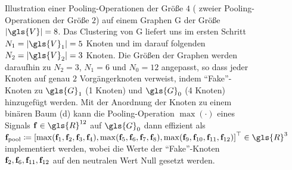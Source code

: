 \begin{figure}[t]
{
}
\caption[Pooling auf Graphen]{Illustration einer Pooling-Operationen der Größe $4$ (\bzw{} zweier Pooling-Operationen der Größe $2$) auf einem Graphen \gls{G} der Größe $\left|\gls{V}\right| = 8$.
Das Clustering von \gls{G} liefert uns im ersten Schritt $N_1 =\left|\gls{V}_1\right| = 5$ Knoten und im darauf folgenden $N_2 = \left|\gls{V}_2\right| = 3$ Knoten.
Die Größen der Graphen werden daraufhin zu $N_2 = 3$, $N_1 = 6$ und $N_0 = 12$ angepasst, so dass jeder Knoten auf genau $2$ Vorgängerknoten verweist, indem \enquote{Fake}-Knoten zu $\gls{G}_1$ (1 Knoten) und $\gls{G}_0$ (4 Knoten) hinzugefügt werden.
Mit der Anordnung der Knoten zu einem binären Baum (d) kann die Pooling-Operation $\max\left(\cdot\right)$ eines Signals $\ve{f} \in \gls{R}^{12}$ auf $\gls{G}_0$ dann effizient als $\ve{f}_{\mathrm{pool}} \coloneqq {\left[ \max\left(\ve{f}_1, \ve{f}_2, \ve{f}_3, \ve{f}_4 \right), \max\left(\ve{f}_5, \ve{f}_6, \ve{f}_7, \ve{f}_8 \right), \max\left(\ve{f}_9, \ve{f}_{10}, \ve{f}_{11}, \ve{f}_{12} \right) \right]}^{\top} \in \gls{R}^3$ implementiert werden, wobei die Werte der \enquote{Fake}-Knoten $\mathbf{f}_2, \mathbf{f}_6, \mathbf{f}_{11}, \mathbf{f}_{12}$ auf den neutralen Wert Null gesetzt werden.}
\label{fig:pooling}
\end{figure}
